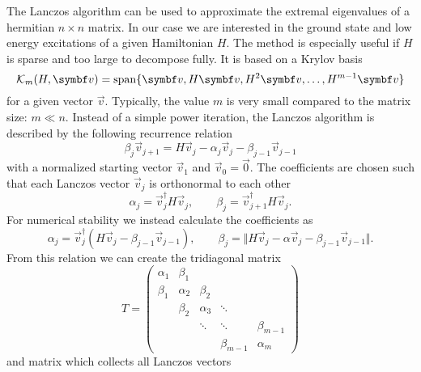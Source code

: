 The Lanczos algorithm \cite{Lanczos1950} can be used to approximate the extremal eigenvalues
of a hermitian $n\times n$ matrix.
In our case we are interested in the ground state and low energy excitations of a
given Hamiltonian $H$.
The method is especially useful if $H$ is sparse and too large to decompose fully.
It is based on a Krylov basis
\begin{equation}
    \mathcal{K}_m(H, \vec{v}) = \spn\{\vec{v}, H\vec{v}, H^2\vec{v}, \ldots, H^{m-1}\vec{v}\}
\end{equation}
for a given vector $\vec{v}$.
Typically, the value $m$ is very small compared to the matrix size: $m \ll n$.
Instead of a simple power iteration, the Lanczos algorithm is described by the
following recurrence relation
\begin{equation}
    \beta_j\vec{v}_{j+1} = H\vec{v}_j - \alpha_j\vec{v}_j - \beta_{j-1}\vec{v}_{j-1}
    \label{eq:Lanczos-recurrence}
\end{equation}
with a normalized starting vector $\vec{v}_1$ and $\vec{v}_0 = \vec{0}$.
The coefficients are chosen such that each Lanczos vector $\vec{v}_j$ is orthonormal to each other
\begin{equation}
    \alpha_j = \vec{v}_j^\dag H \vec{v}_j,
    \qquad
    \beta_j = \vec{v}_{j+1}^\dag H \vec{v}_j.
\end{equation}
For numerical stability \cite{Paige1972, Paige1976}
we instead calculate the coefficients as
\begin{equation}
    \alpha_j = \vec{v}_j^\dag(H \vec{v}_j - \beta_{j-1}\vec{v}_{j-1}),
    \qquad
    \beta_j = \Vert H\vec{v}_j - \alpha\vec{v}_j -  \beta_{j-1}\vec{v}_{j-1} \Vert.
\end{equation}
From this relation we can create the tridiagonal matrix
\begin{equation}
    T
    =
    \begin{pmatrix}
        \alpha_1 & \beta_1  &          &             &             \\
        \beta_1  & \alpha_2 & \beta_2  &             &             \\
                 & \beta_2  & \alpha_3 & \ddots      &             \\
                 &          & \ddots   & \ddots      & \beta_{m-1} \\
                 &          &          & \beta_{m-1} & \alpha_m
    \end{pmatrix}
\end{equation}
and matrix which collects all Lanczos vectors

